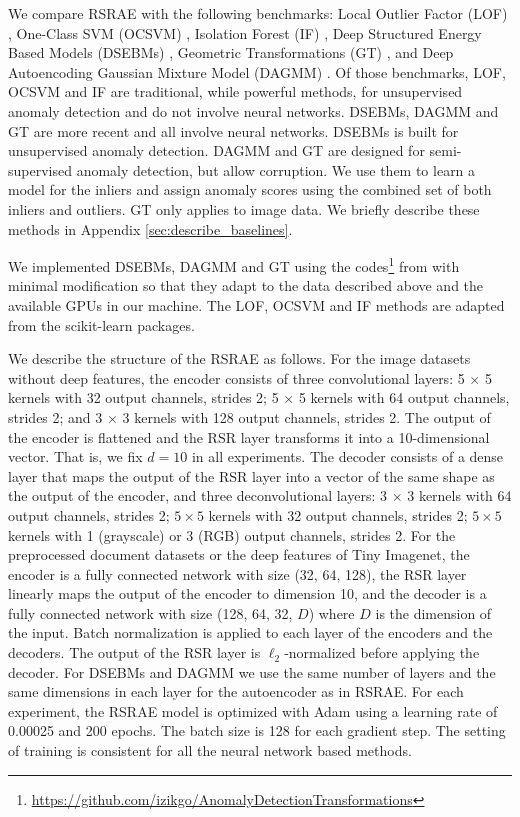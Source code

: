 \documentclass{article} \usepackage{iclr2020_conference,times}
\begin{document}
We compare RSRAE with the following benchmarks: Local Outlier Factor (LOF) \citep{breunig2000lof}, One-Class SVM (OCSVM) \citep{scholkopf2000support, amer2013enhancing}, Isolation Forest (IF) \citep{liu2012isolation}, Deep Structured Energy Based Models (DSEBMs) \citep{zhai2016deep}, Geometric Transformations (GT) \citep{golan2018deep}, and Deep Autoencoding Gaussian Mixture Model (DAGMM) \citep{zong2018deep}. Of those benchmarks, LOF, OCSVM and IF are traditional, while powerful methods, for unsupervised anomaly detection and do not involve neural networks. DSEBMs, DAGMM and GT are more recent and all involve neural networks. DSEBMs is built for unsupervised anomaly detection. DAGMM and GT are designed for semi-supervised anomaly detection, but allow corruption. We use them to learn a model for the inliers and assign anomaly scores using the combined set of both inliers and outliers. GT only applies to image data. We briefly describe these methods in Appendix \ref{sec:describe_baselines}.



We implemented DSEBMs, DAGMM and GT using the codes\footnote{\url{https://github.com/izikgo/AnomalyDetectionTransformations}} from \citet{golan2018deep} with minimal modification so that they adapt to the data described above and the available GPUs in our machine. The LOF, OCSVM and IF methods are adapted from the scikit-learn packages.

We describe the structure of the RSRAE as follows. For the image datasets without deep features, the encoder consists of three convolutional layers: 5 $\times$ 5 kernels with 32 output channels, strides 2; 5 $\times$ 5 kernels with 64 output channels, strides 2; and 3 $\times$ 3 kernels with 128 output channels, strides 2. The output of the encoder is flattened and the RSR layer transforms it into a 10-dimensional vector. That is, we fix $d=10$ in all experiments. The decoder consists of a dense layer that maps the output of the RSR layer into a vector of the same shape as the output of the encoder, and three deconvolutional layers: 3 $\times$ 3 kernels with 64 output channels, strides 2; $5 \times 5$ kernels with 32 output channels, strides 2; $5 \times 5$ kernels with 1 (grayscale) or 3 (RGB) output channels, strides 2. For the preprocessed document datasets or the deep features of Tiny Imagenet, the encoder is a fully connected network with size (32, 64, 128), the RSR layer linearly maps the output of the encoder to dimension 10, and the decoder is a fully connected network with size (128, 64, 32, $D$) where $D$ is the dimension of the input. Batch normalization is applied to each layer of the encoders and the decoders. The output of the RSR layer is $\ell_2$-normalized before applying the decoder. For DSEBMs and DAGMM we use the same number of layers and the same dimensions in each layer for the autoencoder as in RSRAE. For each experiment, the RSRAE model is optimized with Adam using a learning rate of 0.00025 and 200 epochs. The batch size is 128 for each gradient step. The setting of training is consistent for all the neural network based methods. 
\end{document}
